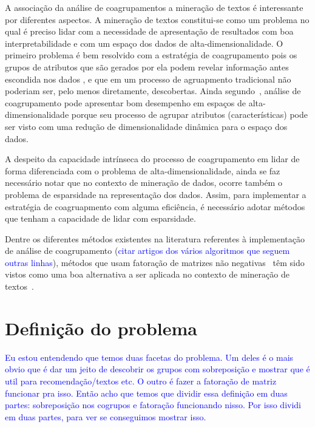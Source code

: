 \documentclass[
    12pt,                %
    oneside,            %
    a4paper,            %
    english,            %
    brazil                %
    ]{abntex2ppgsi}
\begin{document}
A associação da análise de coagrupamentos a mineração de textos é interessante por diferentes aspectos. A mineração de textos constitui-se como um problema no qual é preciso lidar com a necessidade de apresentação de resultados com boa interpretabilidade e com um espaço dos dados de alta-dimensionalidade. O primeiro problema é bem resolvido com a estratégia de coagrupamento pois os grupos de atributos que são gerados por ela podem revelar informação antes escondida nos dados \cite{Tjhi2009}, e que em um processo de agruapmento tradicional não poderiam ser, pelo menos diretamente, descobertas. Ainda segundo~\cite{Tjhi2009}, análise de coagrupamento pode apresentar bom desempenho em espaços de alta-dimensionalidade porque seu processo de agrupar atributos (características) pode ser visto com uma redução de dimensionalidade dinâmica para o espaço dos dados.

A despeito da capacidade intrínseca do processo de coagrupamento em lidar de forma diferenciada com o problema de alta-dimensionalidade, ainda se faz necessário notar que no contexto de mineração de dados, ocorre também o problema de esparsidade na representação dos dados. Assim, para implementar a estratégia de coagruapmento com alguma eficiência, é necessário adotar métodos que tenham a capacidade de lidar com esparsidade.

Dentre os diferentes métodos existentes na literatura referentes à implementação de análise de coagrupamento (\textcolor{blue}{citar artigos dos vários algoritmos que seguem outras linhas}), métodos que usam fatoração de matrizes não negativas~\cite{lee:nnmf00, lee99} têm sido vistos como uma boa alternativa a ser aplicada no contexto de mineração de textos~\cite{Xu2003, Shahnaz2006373, Yoo2010}.


\section{Definição do problema}

\textcolor{blue}{Eu estou entendendo que temos duas facetas do problema. Um deles é o mais obvio que é dar um jeito de descobrir os grupos com sobreposição e mostrar que é util para recomendação/textos etc. O outro é fazer a fatoração de matriz funcionar pra isso. Então acho que temos que dividir essa definição em duas partes: sobreposição nos cogrupos e fatoração funcionando nisso. Por isso dividi em duas partes, para ver se conseguimos mostrar isso.}
\end{document}

